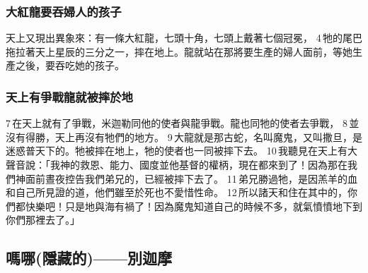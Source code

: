 \subsubsection{大紅龍要吞婦人的孩子}

天上又現出異象來：有一條大紅龍，七頭十角，七頭上戴著七個冠冕， 4 牠的尾巴拖拉著天上星辰的三分之一，摔在地上。龍就站在那將要生產的婦人面前，等她生產之後，要吞吃她的孩子。

\subsubsection{天上有爭戰龍就被摔於地}

7 在天上就有了爭戰，米迦勒同他的使者與龍爭戰。龍也同牠的使者去爭戰， 8 並沒有得勝，天上再沒有牠們的地方。 9 大龍就是那古蛇，名叫魔鬼，又叫撒旦，是迷惑普天下的。牠被摔在地上，牠的使者也一同被摔下去。 10 我聽見在天上有大聲音說：「我神的救恩、能力、國度並他基督的權柄，現在都來到了！因為那在我們神面前晝夜控告我們弟兄的，已經被摔下去了。 11 弟兄勝過牠，是因羔羊的血和自己所見證的道，他們雖至於死也不愛惜性命。 12 所以諸天和住在其中的，你們都快樂吧！只是地與海有禍了！因為魔鬼知道自己的時候不多，就氣憤憤地下到你們那裡去了。」










\subsection{嗎哪(隱藏的)——別迦摩}

